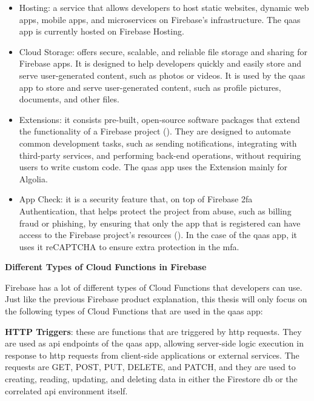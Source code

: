 \begin{multicols}{2}
      \begin{itemize}
            \item Hosting: a service that allows developers to host static websites, dynamic web apps, mobile apps, and
                  microservices on Firebase's infrastructure. The \acrshort{qaas} app is currently hosted on Firebase
                  Hosting.
            \item Cloud Storage: offers secure, scalable, and reliable file storage and sharing for Firebase apps.
                  It is designed to help developers quickly and easily store and serve user-generated content, such as
                  photos or videos. It is used by the \acrshort{qaas} app to store and serve user-generated content, such as
                  profile pictures, documents, and other files.
            \item Extensions: it consists pre-built, open-source software packages that extend the functionality of a Firebase
                  project (\textit{\cite{firebaseExtension}}). They are designed to automate common development tasks, such as
                  sending notifications, integrating with third-party services, and performing back-end operations, without
                  requiring users to write custom code. The \acrshort{qaas} app uses the Extension mainly for Algolia.
            \item App Check: it is a security feature that, on top of Firebase \acrshort{2fa} Authentication, that helps protect
                  the project from abuse, such as billing fraud or phishing, by ensuring that only the app that is registered
                  can have access to the Firebase project's resources (\textit{\cite{appCheckFirebase}}). In the case of the
                  \acrshort{qaas} app, it uses it \gls{reCAPTCHA} to ensure extra protection in the \acrshort{mfa}.
      \end{itemize}

      \textbf{Different Types of Cloud Functions in Firebase}

      Firebase has a lot of different types of Cloud Functions that developers can use. Just like the previous Firebase product
      explanation, this thesis will only focus on the following types of Cloud Functions that are used in the \acrshort{qaas} app:

      \textbf{HTTP Triggers}: these are functions that are triggered by \acrshort{http} requests. They are used as \acrshort{api}
      endpoints of the \acrshort{qaas} app, allowing server-side logic execution in response to \acrshort{http} requests from
      client-side applications or external services. The requests are GET, POST, PUT, DELETE, and PATCH, and they are used to
      creating, reading, updating, and deleting data in either the Firestore \acrshort{db} or the correlated \acrshort{api}
      environment itself.


\end{multicols}
